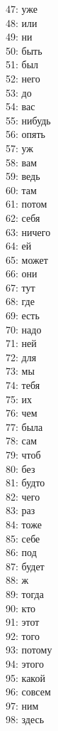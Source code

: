 \documentclass[14pt]{matmex-diploma-custom}
\begin{document}
\begin{appendices}
\begin{multicols}{5}
47: уже\\
48: или\\
49: ни\\
50: быть\\
51: был\\
52: него\\
53: до\\
54: вас\\
55: нибудь\\
56: опять\\
57: уж\\
58: вам\\
59: ведь\\
60: там\\
61: потом\\
62: себя\\
63: ничего\\
64: ей\\
65: может\\
66: они\\
67: тут\\
68: где\\
69: есть\\
70: надо\\
71: ней\\
72: для\\
73: мы\\
74: тебя\\
75: их\\
76: чем\\
77: была\\
78: сам\\
79: чтоб\\
80: без\\
81: будто\\
82: чего\\
83: раз\\
84: тоже\\
85: себе\\
86: под\\
87: будет\\
88: ж\\
89: тогда\\
90: кто\\
91: этот\\
92: того\\
93: потому\\
94: этого\\
95: какой\\
96: совсем\\
97: ним\\
98: здесь\\

\end{multicols}
\end{appendices}
\end{document}
